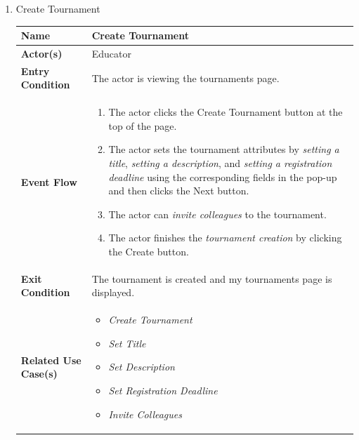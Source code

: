 \begin{enumerate}
\item Create Tournament
\begin{center}
    \begin{tabular}{ | m{10em} | m{10cm}| } 
      \hline
      \textbf{Name} & Create Tournament  \\ 
      \hline
      \textbf{Actor(s)} & Educator \\ 
      \hline
      \textbf{Entry Condition} & The actor is viewing the tournaments page. \\ 
      \hline
      \textbf{Event Flow} & 
          \begin{enumerate}[(1)]
              \item The actor clicks the Create Tournament button at the top of the page.
              \item The actor sets the tournament attributes by \textit{setting a title}, \textit{setting a description}, and \textit{setting a registration deadline} using the corresponding fields in the pop-up and then clicks the Next button.
              \item The actor can \textit{invite colleagues} to the tournament.
              \item The actor finishes the \textit{tournament creation} by clicking the Create button.
          \end{enumerate}
      \\ 
      \hline
      \textbf{Exit Condition} & The tournament is created and my tournaments page is displayed.  \\ 
      \hline
      \textbf{Related Use Case(s)} & 
      \begin{itemize}
          \item \textit{Create Tournament}
          \item \textit{Set Title}
          \item \textit{Set Description}
          \item \textit{Set Registration Deadline}
          \item \textit{Invite Colleagues}
      \end{itemize}
          \\ 
      \hline
    \end{tabular}
     \label{tbl:uc20}
\end{center}



\newpage


\end{enumerate}

